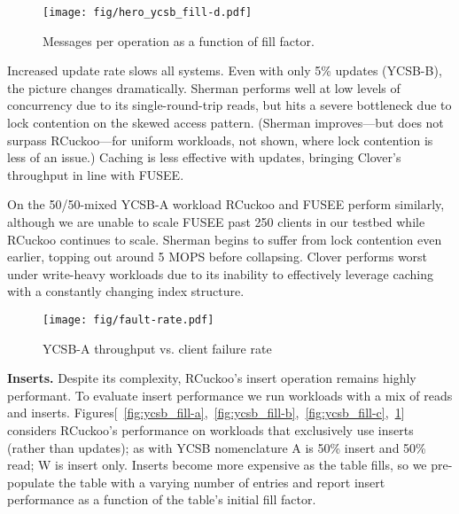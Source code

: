 \begin{figure}
  \center
  \texttt{[image: fig/hero\_ycsb\_fill-d.pdf]}
  \caption{Messages per operation as a function of fill factor.}
  \label{fig:ycsb_fill-d}
\end{figure}


Increased update rate slows all systems.  Even with only 5\% updates (YCSB-B), the picture changes
dramatically.  Sherman performs well at low levels of concurrency due to its
single-round-trip reads, but hits a severe bottleneck due to lock contention on the skewed access
pattern.  (Sherman improves---but does not surpass RCuckoo---for uniform workloads,
not shown, where lock contention is less of an issue.) Caching is less effective with updates,
bringing Clover's throughput in line with FUSEE.

On the 50/50-mixed YCSB-A workload RCuckoo and FUSEE perform
similarly, although we are unable to scale FUSEE past 250 clients in
our testbed while RCuckoo continues to scale.
Sherman begins to suffer from lock contention even earlier, topping
out around 5 MOPS before collapsing.  Clover performs worst under
write-heavy workloads due to its inability to effectively leverage
caching with a constantly changing index structure.





\begin{figure}
\centering
      \texttt{[image: fig/fault-rate.pdf]}
\caption{YCSB-A throughput vs. client failure rate}
             \label{fig:microbenchmarks-a}
\end{figure}


\textbf{Inserts.}
Despite its complexity, RCuckoo's insert operation remains highly performant.  To evaluate insert
performance we run workloads with a mix of reads and inserts.  Figures[~\ref{fig:ycsb_fill-a},~\ref{fig:ycsb_fill-b},~\ref{fig:ycsb_fill-c},~\ref{fig:ycsb_fill-d}] considers
RCuckoo's performance on workloads that exclusively use inserts (rather than updates); as with YCSB nomenclature A is 50\% insert and 50\% read; W is insert only. Inserts become more expensive as the table fills, so we pre-populate the table with a
varying number of entries and report insert performance as a function of the table's initial fill
factor.  

